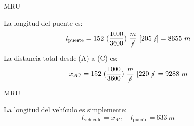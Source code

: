 \documentclass{beamer}
\begin{document}
\begin{frame}{MRU}
% 

La longitud del puente es:
{\large
\begin{equation} 
l_{\text{puente}}=
152~(\frac{1000}{3600})~
\frac{m}{\cancel{s}}~[205~\cancel{s}]=
8655~m
\end{equation}
}

                               

La distancia total desde (A) a (C) es: 
{\large
\begin{equation} 
x_{AC}=
152~(\frac{1000}{3600})~
\frac{m}{\cancel{s}}~[220~\cancel{s}]=
9288~m
\end{equation}
}

\end{frame}

\begin{frame}{MRU}
% 

La longitud del veh{\'i}culo es simplemente:
{\large
\begin{equation} 
l_{\text{veh{\'i}culo}}=
x_{AC}-l_{\text{puente}}
=
633~m
\end{equation}
}

                               




\end{frame}


\end{document}
